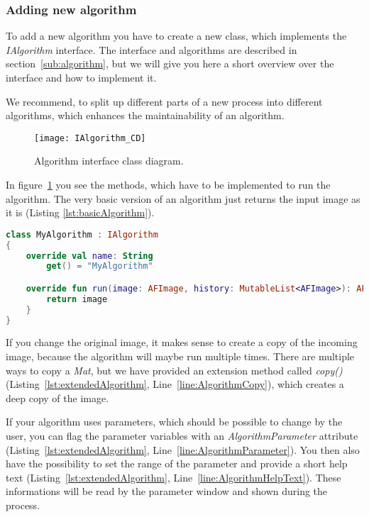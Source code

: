 \subsubsection{Adding new algorithm}
To add a new algorithm you have to create a new class, which implements the \textit{IAlgorithm} interface. The interface and algorithms are described in section~\ref{sub:algorithm}, but we will give you here a short overview over the interface and how to implement it.

We recommend, to split up different parts of a new process into different algorithms, which enhances the maintainability of an algorithm.

\begin{figure}[h]
  \centering
      \texttt{[image: IAlgorithm\_CD]}
  \caption{Algorithm interface class diagram.}
  \label{fig:IAlgorithm_CD_DG}
\end{figure}

In figure~\ref{fig:IAlgorithm_CD_DG} you see the methods, which have to be implemented to run the algorithm. The very basic version of an algorithm just returns the input image as it is (Listing \ref{lst:basicAlgorithm}).

\begin{lstlisting}[caption={Basic version of an algorithm.}, label={lst:basicAlgorithm}, language=Kotlin]
class MyAlgorithm : IAlgorithm
{
    override val name: String
        get() = "MyAlgorithm"

    override fun run(image: AFImage, history: MutableList<AFImage>): AFImage {
        return image
    }
}
\end{lstlisting}

If you change the original image, it makes sense to create a copy of the incoming image, because the algorithm will maybe run multiple times. There are multiple ways to copy a \textit{Mat}, but we have provided an extension method called \textit{copy()} (Listing~\ref{lst:extendedAlgorithm}, Line~\ref{line:AlgorithmCopy}), which creates a deep copy of the image.

If your algorithm uses parameters, which should be possible to change by the user, you can flag the parameter variables with an \textit{AlgorithmParameter} attribute (Listing~\ref{lst:extendedAlgorithm}, Line~\ref{line:AlgorithmParameter}). You then also have the possibility to set the range of the parameter and provide a short help text (Listing~\ref{lst:extendedAlgorithm}, Line~\ref{line:AlgorithmHelpText}). These informations will be read by the parameter window and shown during the process.

